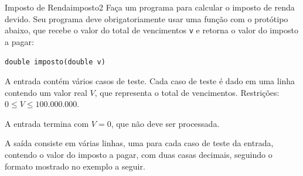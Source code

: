 \documentclass[12pt,a4paper,oneside]{article}
\begin{document}
\begin{problem}{Imposto de Renda}{imposto}{2}
Faça um programa para calcular o imposto de renda devido. Seu programa deve obrigatoriamente usar uma função com o protótipo abaixo, que recebe o valor do total de vencimentos \texttt{v} e retorna o valor do imposto a pagar:

\texttt{\textcolor{Mulberry}{double} imposto(\textcolor{Mulberry}{double} v)}


%

\InputFile

A entrada contém vários casos de teste. Cada caso de teste é dado em uma linha contendo um valor real $V$, que representa o total de vencimentos. Restrições: $0 \le V \leq 100.000.000$.

A entrada termina com $V = 0$, que não deve ser processada.

\OutputFile

A saída consiste em várias linhas, uma para cada caso de teste da entrada, contendo o valor do imposto a pagar, com duas casas decimais, seguindo o formato mostrado no exemplo a seguir.


\Example

\begin{example}
%
\end{example}




\end{problem}
\end{document}
